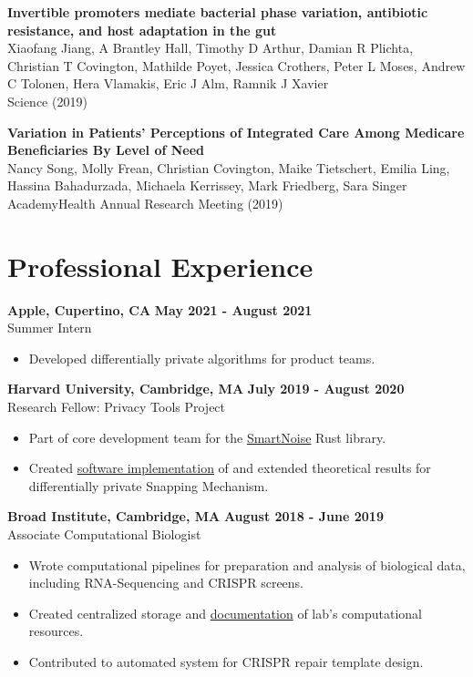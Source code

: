 \documentclass[margin,line]{res}
\begin{document}
\begin{resume}
\textbf{Invertible promoters mediate bacterial phase variation, antibiotic resistance, and host adaptation in the gut} \\
Xiaofang Jiang, A Brantley Hall, Timothy D Arthur, Damian R Plichta, Christian T Covington, Mathilde Poyet, Jessica Crothers, Peter L Moses, Andrew C Tolonen, Hera Vlamakis, Eric J Alm, Ramnik J Xavier \\
Science (2019)

\textbf{Variation in Patients’ Perceptions of Integrated Care Among Medicare Beneficiaries By Level of Need} \\ 
Nancy Song, Molly Frean, Christian Covington, Maike Tietschert, Emilia Ling, Hassina Bahadurzada, Michaela Kerrissey, Mark Friedberg, Sara Singer \\
AcademyHealth Annual Research Meeting (2019)

\section{\sc Professional Experience}
\textbf{Apple, Cupertino, CA} \hfill \textbf{May 2021 - August 2021} \\
Summer Intern \\ 
\begin{itemize} 
    \item Developed differentially private algorithms for product teams.
\end{itemize}

\textbf{Harvard University, Cambridge, MA} \hfill \textbf{July 2019 - August 2020} \\ 
Research Fellow: Privacy Tools Project \\
\begin{itemize}
  \item Part of core development team for the \href{https://github.com/opendifferentialprivacy/smartnoise-core}{SmartNoise} Rust library.
  \item Created \href{https://github.com/ctcovington/floating_point}{software implementation} of and extended theoretical results for differentially private Snapping Mechanism. 
\end{itemize}

\textbf{Broad Institute, Cambridge, MA} \hfill \textbf{August 2018 - June 2019} \\
Associate Computational Biologist \\
\begin{itemize}
    \item Wrote computational pipelines for preparation and analysis of biological data, including RNA-Sequencing and CRISPR screens.
    \item Created centralized storage and \href{https://xavier-lab.readthedocs.io/en/master/?}{documentation} of lab's computational resources.
    \item Contributed to automated system for CRISPR repair template design. 
\end{itemize}


\end{resume}
\end{document}
